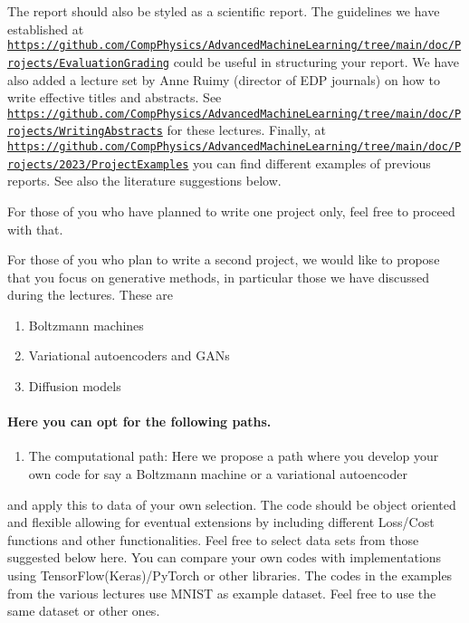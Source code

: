 \documentclass[%
oneside,                 %
final,                   %
10pt]{article}
\begin{document}
The report should also be styled as a scientific report. The guidelines
we have established at
\href{{https://github.com/CompPhysics/AdvancedMachineLearning/tree/main/doc/Projects/EvaluationGrading}}{\nolinkurl{https://github.com/CompPhysics/AdvancedMachineLearning/tree/main/doc/Projects/EvaluationGrading}}
could be useful in structuring your report. We have also added a
lecture set by Anne Ruimy (director of EDP journals) on how to write
effective titles and abstracts. See
\href{{https://github.com/CompPhysics/AdvancedMachineLearning/tree/main/doc/Projects/WritingAbstracts}}{\nolinkurl{https://github.com/CompPhysics/AdvancedMachineLearning/tree/main/doc/Projects/WritingAbstracts}}
for these lectures. Finally, at
\href{{https://github.com/CompPhysics/AdvancedMachineLearning/tree/main/doc/Projects/2023/ProjectExamples}}{\nolinkurl{https://github.com/CompPhysics/AdvancedMachineLearning/tree/main/doc/Projects/2023/ProjectExamples}}
you can find different examples of previous reports. See also the literature suggestions below.

For those of you who have planned to write one project only, feel free to proceed with that.

For those of you who plan to write a second project, we would like to
propose that you focus on generative methods, in particular those we
have discussed during the lectures. These are

\begin{enumerate}
\item Boltzmann machines

\item Variational autoencoders and GANs

\item Diffusion models
\end{enumerate}

\noindent
\paragraph{Here you can opt for the following paths.}
\begin{enumerate}
\item The computational path: Here we propose a path where you develop your own code for say a Boltzmann machine or a variational autoencoder
\end{enumerate}

\noindent
and apply this to data of your own selection. The code should be object oriented and flexible allowing for eventual extensions by including different Loss/Cost functions and other functionalities. Feel free to select data sets from those suggested below here. You can compare your own codes with implementations using TensorFlow(Keras)/PyTorch or other libraries. The codes in the examples from the various lectures use MNIST as example dataset. Feel free to use the same dataset or other ones. 
\end{document}
